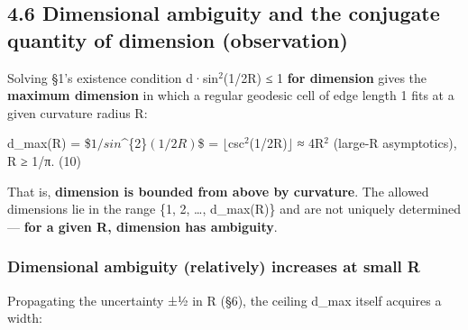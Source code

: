\documentclass[
]{ltjsarticle}
\begin{document}
\subsection{4.6 Dimensional ambiguity and the conjugate quantity of
dimension
(observation)}\label{dimensional-ambiguity-and-the-conjugate-quantity-of-dimension-observation}

Solving §1's existence condition d·sin\(^{2}\)(1/2R) ≤ 1 \textbf{for
dimension} gives the \textbf{maximum dimension} in which a regular
geodesic cell of edge length 1 fits at a given curvature radius R:

d\_max(R) = \$\lfloor\(1/sin\)\^{}\{2\}\((1/2R)\)\rfloor\$ =
\(\lfloor\)csc\(^{2}\)(1/2R)\(\rfloor\) ≈ 4R\(^{2}\) (large-R
asymptotics), R ≥ 1/π. (10)

That is, \textbf{dimension is bounded from above by curvature}. The
allowed dimensions lie in the range \{1, 2, \ldots, d\_max(R)\} and are
not uniquely determined --- \textbf{for a given R, dimension has
ambiguity}.

\subsubsection{Dimensional ambiguity (relatively) increases at small
R}\label{dimensional-ambiguity-relatively-increases-at-small-r}

Propagating the uncertainty ±½ in R (§6), the ceiling d\_max itself
acquires a width:
\end{document}
